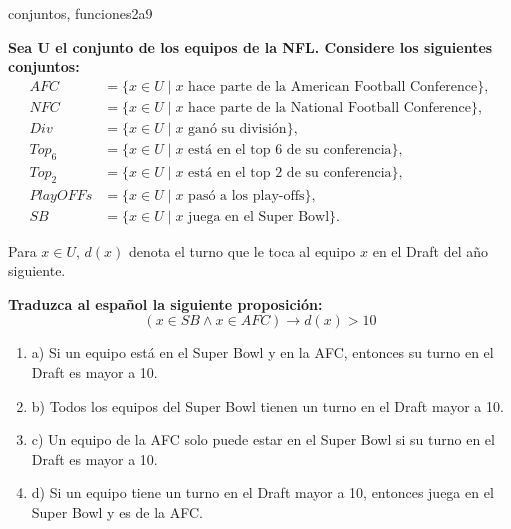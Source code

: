 \documentclass{article}
\begin{document}
\begin{question}{21}{conjuntos, funciones}{2}{a}{9}{
\textbf{Sea U el conjunto de los equipos de la NFL. Considere los siguientes conjuntos:}
\[
\begin{aligned}
AFC &= \{ x \in U \mid x \text{ hace parte de la American Football Conference}\},\\
NFC &= \{ x \in U \mid x \text{ hace parte de la National Football Conference}\},\\
Div &= \{ x \in U \mid x \text{ ganó su división}\},\\
Top_6 &= \{ x \in U \mid x \text{ está en el top 6 de su conferencia}\},\\
Top_2 &= \{ x \in U \mid x \text{ está en el top 2 de su conferencia}\},\\
PlayOFFs &= \{ x \in U \mid x \text{ pasó a los play-offs}\},\\
SB &= \{ x \in U \mid x \text{ juega en el Super Bowl}\}.
\end{aligned}
\]

Para $x \in U$, $d(x)$ denota el turno que le toca al equipo $x$ en el Draft del año siguiente. \medskip

\textbf{Traduzca al español la siguiente proposición:}
\[
(x \in SB \land x \in AFC)\to d(x)>10
\]

\begin{enumerate}
    \item a) Si un equipo está en el Super Bowl y en la AFC, entonces su turno en el Draft es mayor a 10.  
    \item b) Todos los equipos del Super Bowl tienen un turno en el Draft mayor a 10.  
    \item c) Un equipo de la AFC solo puede estar en el Super Bowl si su turno en el Draft es mayor a 10.  
    \item d) Si un equipo tiene un turno en el Draft mayor a 10, entonces juega en el Super Bowl y es de la AFC.  
\end{enumerate}
}
\end{question}
\end{document}
